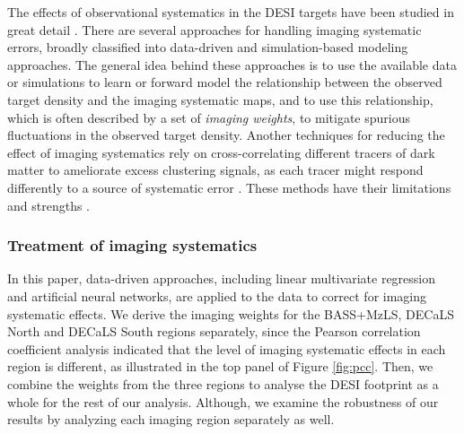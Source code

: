 The effects of observational systematics in the DESI targets have been studied in great detail \cite[see, e.g.,][]{kitanidis2020imaging, zhou2021clustering, chaussidon2022angular}. There are several approaches for handling imaging systematic errors, broadly classified into data-driven and simulation-based modeling approaches. The general idea behind these approaches is to use the available data or simulations to learn or forward model the relationship between the observed target density and the imaging systematic maps, and to use this relationship, which is often described by a set of \textit{imaging weights}, to mitigate spurious fluctuations in the observed target density. Another techniques for reducing the effect of imaging systematics rely on cross-correlating different tracers of dark matter to ameliorate excess clustering signals, as each tracer might respond differently to a source of systematic error \citep[see, e.g.,][]{giannantonio2014improved}. These methods have their limitations and strengths \citep[see, e.g.,][for a review]{2021MNRAS.503.5061W}.

\subsubsection{Treatment of imaging systematics}
In this paper, data-driven approaches, including linear multivariate regression and artificial neural networks, are applied to the data to correct for imaging systematic effects. We derive the imaging weights for the BASS+MzLS, DECaLS North and DECaLS South regions separately, since the Pearson correlation coefficient analysis indicated that the level of imaging systematic effects in each region is different, as illustrated in the top panel of Figure \ref{fig:pcc}. Then, we combine the weights from the three regions to analyse the DESI footprint as a whole for the rest of our analysis. Although, we examine the robustness of our results by analyzing each imaging region separately as well.

